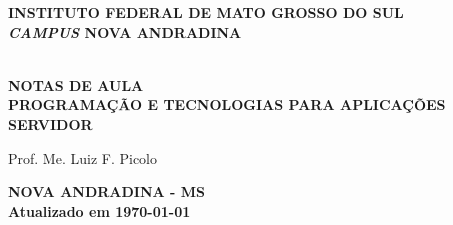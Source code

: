\thispagestyle{empty}

\vfill
 \begin{center}
    
    {\large\bfseries INSTITUTO FEDERAL DE MATO GROSSO DO SUL} \\
    
    {\large\bfseries \textit{CAMPUS} NOVA ANDRADINA}  \\ 

    \vspace*{1in}

    \vspace*{4cm}
    \noindent \\
    
    \large\bfseries{NOTAS DE AULA} \\
    \huge\bfseries{PROGRAMAÇÃO E TECNOLOGIAS PARA APLICAÇÕES SERVIDOR}
    
    \vspace*{4cm}
    
    \large{Prof. Me. Luiz F. Picolo}
    
    \vfill
    \large\bfseries{NOVA ANDRADINA - MS} \\ 
    \vspace{0.2cm}
    \small Atualizado em \today
\end{center}

\normalsize


